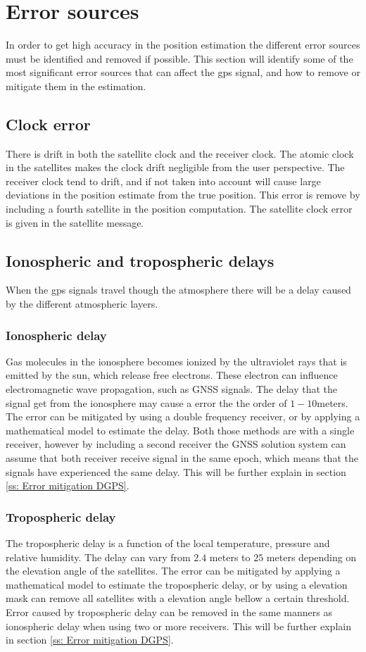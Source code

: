  
\section{Error sources}
In order to get high accuracy in the position estimation the different error sources must be identified and removed if possible. This section will identify some of the most significant error sources that can affect the \gls{gps} signal, and how to remove or mitigate them in the estimation.
\subsection{Clock error}
There is drift in both the satellite clock and the receiver clock. The atomic clock in the satellites makes the clock drift negligible from the user perspective. The receiver clock tend to drift, and if not taken into account will cause large deviations in the position estimate from the true position. This error is remove by including a fourth satellite in the position computation. The satellite clock error is given in the satellite message. 

\subsection{Ionospheric and tropospheric delays}
When the \gls{gps} signals travel though the atmosphere there will be a delay caused by the different atmospheric layers.
\subsubsection{Ionospheric delay}
Gas molecules in the ionosphere becomes ionized by the ultraviolet rays that is emitted by the sun, which release free electrons. These electron can influence electromagnetic wave propagation, such as GNSS signals. The delay that the signal get from the ionosphere may cause a error the the order of $1-10 $meters. The error can be mitigated by using a double frequency receiver, or by applying a mathematical model to estimate the delay. Both those methods are with a single receiver, however by including a second receiver the GNSS solution system can assume that both receiver receive signal in the same epoch, which means that the signals have experienced the same delay. This will be further explain in section \ref{ss: Error mitigation DGPS}.

\subsubsection{Tropospheric delay}
The tropospheric delay is a function of the local temperature, pressure and relative humidity. The delay can vary from $2.4$ meters to $25$ meters depending on the elevation angle of the satellites. The error can be mitigated by applying a mathematical model to estimate the tropospheric delay, or by using a elevation mask can remove all satellites with a elevation angle bellow a certain threshold. Error caused by tropospheric delay can be removed in the same manners as ionospheric delay when using two or more receivers. This will be further explain in section \ref{ss: Error mitigation DGPS}.

